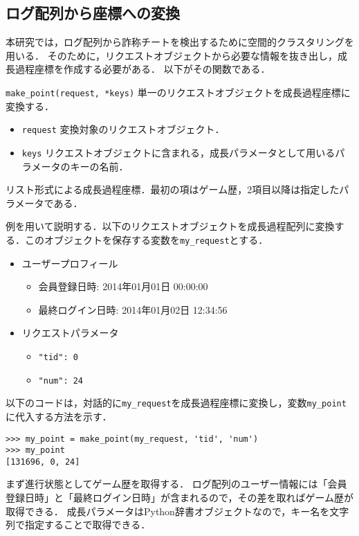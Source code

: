 \subsection{ログ配列から座標への変換}
本研究では，ログ配列から詐称チートを検出するために空間的クラスタリングを用いる．
そのために，リクエストオブジェクトから必要な情報を抜き出し，成長過程座標を作成する必要がある．
以下がその関数である．

\begin{pydef}
{\tt make\_point(request, *keys)}
単一のリクエストオブジェクトを成長過程座標に変換する．

\param
\begin{itemize}
\item
{\tt request} 変換対象のリクエストオブジェクト．
\item
{\tt keys} リクエストオブジェクトに含まれる，成長パラメータとして用いるパラメータのキーの名前．
\end{itemize}

\pyreturn
リスト形式による成長過程座標．最初の項はゲーム歴，2項目以降は指定したパラメータである．

\end{pydef}

例を用いて説明する．以下のリクエストオブジェクトを成長過程配列に変換する．このオブジェクトを保存する変数を{\tt my\_request}とする．

\begin{itemize}
\item
ユーザープロフィール
\begin{itemize}
\item
会員登録日時: 2014年01月01日 00:00:00
\item
最終ログイン日時: 2014年01月02日 12:34:56
\end{itemize}
\item
リクエストパラメータ
\begin{itemize}
\item
{\tt "tid": 0}
\item
{\tt "num": 24}
\end{itemize}
\end{itemize}

以下のコードは，対話的に{\tt my\_request}を成長過程座標に変換し，変数{\tt my\_point}に代入する方法を示す．

\begin{lstlisting}
>>> my_point = make_point(my_request, 'tid', 'num')
>>> my_point
[131696, 0, 24]
\end{lstlisting}

まず進行状態としてゲーム歴を取得する．
ログ配列のユーザー情報には「会員登録日時」と「最終ログイン日時」が含まれるので，その差を取ればゲーム歴が取得できる．
成長パラメータはPython辞書オブジェクトなので，キー名を文字列で指定することで取得できる．
